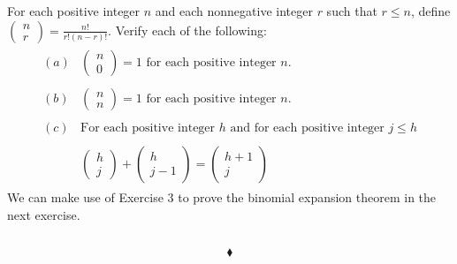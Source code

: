 \subsection{}
\begin{tcolorbox}
 For each positive integer $n$ and each nonnegative integer $r$   such that $r\leq n$, define $\left(\begin{matrix}n\\ r\end{matrix}\right) =\frac{n!}{r!(n- r)!}$. Verify each of the following:
 \begin{align*}
 \begin{array}{ll} 
(a)& \left(\begin{matrix}n\\ 0\end{matrix}\right) = 1\text{ for each positive integer } n. \\\\
(b) &\left(\begin{matrix}n\\ n\end{matrix}\right) = 1\text{ for each positive integer } n. \\\\
(c)& \text{For each positive integer }  h \text{ and for each positive integer } j\le h\\\\
& \left(\begin{matrix}h\\ j\end{matrix}\right)+\left(\begin{matrix}h\\ j-1\end{matrix}\right)=\left(\begin{matrix}h+1\\ j\end{matrix}\right)
\end{array}
\end{align*}
We can make use of Exercise 3 to prove the binomial expansion theorem in the next exercise. 
\end{tcolorbox}
$$ $$

$$\blacklozenge$$
